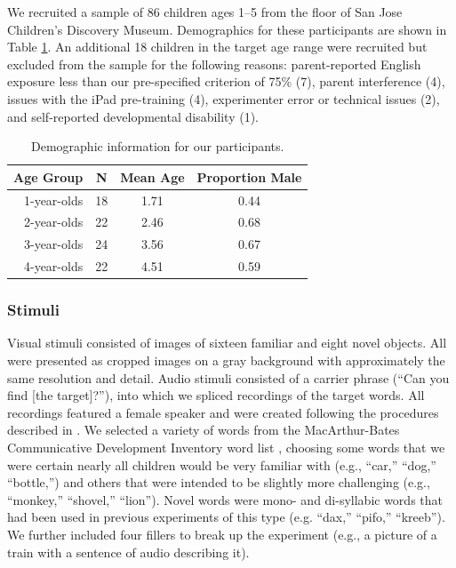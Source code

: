 \documentclass[man,noapacite]{apa2}
\begin{document}

We recruited a sample of 86 children ages 1--5 from the floor of San Jose Children's Discovery Museum. Demographics for these participants are shown in Table \ref{tab:demo}. An additional 18 children in the target age range were recruited but excluded from the sample for the following reasons: parent-reported English exposure less than our pre-specified criterion of 75\% (7), parent interference (4), issues with the iPad pre-training (4), experimenter error or technical issues (2), and self-reported developmental disability (1). 

\begin{table}[t]
\centering
\caption{\label{tab:demo} Demographic information for our participants.}
\begin{tabular}{rccc}
  \hline
Age Group & N & Mean Age & Proportion Male \\ 
  \hline
1-year-olds &  18 & 1.71 & 0.44 \\ 
2-year-olds &  22 & 2.46 & 0.68 \\ 
3-year-olds &  24 & 3.56 & 0.67 \\ 
4-year-olds &  22 & 4.51 & 0.59 \\ 
   \hline
\end{tabular}
\end{table}


\subsubsection{Stimuli}

Visual stimuli consisted of images of sixteen familiar and eight novel objects. All were presented as cropped images on a gray background with approximately the same resolution and detail.  Audio stimuli consisted of a carrier phrase (``Can you find [the target]?''), into which we spliced recordings of the target words. All recordings featured a female speaker and were created following the procedures described in . We selected a variety of words from the MacArthur-Bates Communicative Development Inventory word list \cite{fenson1994,fenson2007}, choosing some words that we were certain nearly all children would be very familiar with (e.g., ``car,'' ``dog,'' ``bottle,'') and others that were intended to be slightly more challenging (e.g., ``monkey,'' ``shovel,'' ``lion''). Novel words were mono- and di-syllabic words that had been used in previous experiments of this type (e.g. ``dax,'' ``pifo,'' ``kreeb''). We further included four fillers to break up the experiment (e.g., a picture of a train with a sentence of audio describing it).
\end{document}
